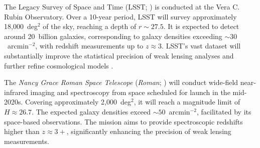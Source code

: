 The Legacy Survey of Space and Time (LSST; \citealt{2009arXiv0912.0201L, 2019ApJ...873..111I}) is conducted at the Vera C. Rubin Observatory. Over a 10-year period, LSST will survey approximately 18,000~deg$^2$ of the sky, reaching a depth of $r \sim 27.5$. It is expected to detect around 20~billion galaxies, corresponding to galaxy densities exceeding $\sim 30$~arcmin$^{-2}$, with redshift measurements up to $z \approx 3$. LSST's vast dataset will substantially improve the statistical precision of weak lensing analyses and further refine cosmological models \citep{2012arXiv1211.0310L}.

The \textit{Nancy Grace Roman Space Telescope} (\emph{Roman}; \citealt{2015arXiv150303757S}) will conduct wide-field near-infrared imaging and spectroscopy from space scheduled for launch in the mid-2020s. Covering approximately 2,000~deg$^2$, it will reach a magnitude limit of $H \approx 26.7$. The expected galaxy densities exceed $\sim 50$~arcmin$^{-2}$, facilitated by its space-based observations. The mission aims to provide spectroscopic redshifts higher than $z \approx 3+$, significantly enhancing the precision of weak lensing measurements.